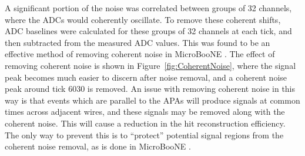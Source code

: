A significant portion of the noise was correlated between groups of 32 channels, where the ADCs would coherently oscillate. To remove these coherent shifts, ADC baselines were calculated for these groups of 32 channels at each tick, and then subtracted from the measured ADC values. This was found to be an effective method of removing coherent noise in MicroBooNE \citep{uBooNENoise}. The effect of removing coherent noise is shown in Figure~\ref{fig:CoherentNoise}, where the signal peak becomes much easier to discern after noise removal, and a coherent noise peak around tick 6030 is removed. An issue with removing coherent noise in this way is that events which are parallel to the APAs will produce signals at common times across adjacent wires, and these signals may be removed along with the coherent noise. This will cause a reduction in the hit reconstruction efficiency. The only way to prevent this is to ``protect'' potential signal regions from the coherent noise removal, as is done in MicroBooNE \citep{uBooNENoise}. \\

